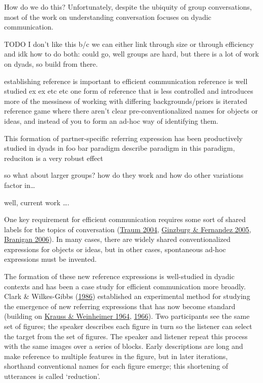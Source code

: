 \documentclass[
  english,
  a4paper,
]{article}
\begin{document}
How do we do this? Unfortunately, despite the ubiquity of group conversations, most of the work on understanding conversation focuses on dyadic communication.

TODO I don't like this b/c we can either link through size or through efficiency and idk how to do both: could go, well groups are hard, but there is a lot of work on dyads, so build from there.

establishing reference is important to efficient communication
reference is well studied ex ex etc etc
one form of reference that is less controlled and introduces more of the messiness of working with differing backgrounds/priors is iterated reference game where there aren't clear pre-conventionalized names for objects or ideas, and instead of you to form an ad-hoc way of identifying them.

This formation of partner-specific referring expression has been productively studied in dyads in foo bar paradigm
describe paradigm
in this paradigm, reduciton is a very robust effect

so what about larger groups? how do they work and how do other variations factor in\ldots{}

well, current work \ldots.

One key requirement for efficient communication requires some sort of shared labels for the topics of conversation (\protect\hyperlink{ref-traum2004}{Traum 2004}, \protect\hyperlink{ref-ginzburg2005}{Ginzburg \& Fernandez 2005}, \protect\hyperlink{ref-branigan2006}{Branigan 2006}). In many cases, there are widely shared conventionalized expressions for objects or ideas, but in other cases, spontaneous ad-hoc expressions must be invented.

The formation of these new reference expressions is well-studied in dyadic contexts and has been a case study for efficient communication more broadly. Clark \& Wilkes-Gibbs (\protect\hyperlink{ref-clarkReferringCollaborativeProcess1986}{1986}) established an experimental method for studying the emergence of new referring expressions that has now become standard (building on \protect\hyperlink{ref-kraussChangesReferencePhrases1964}{Krauss \& Weinheimer 1964}, \protect\hyperlink{ref-kraussConcurrentFeedbackConfirmation1966}{1966}). Two participants see the same set of figures; the speaker describes each figure in turn so the listener can select the target from the set of figures. The speaker and listener repeat this process with the same images over a series of blocks. Early descriptions are long and make reference to multiple features in the figure, but in later iterations, shorthand conventional names for each figure emerge; this shortening of utterances is called `reduction'.
\end{document}
